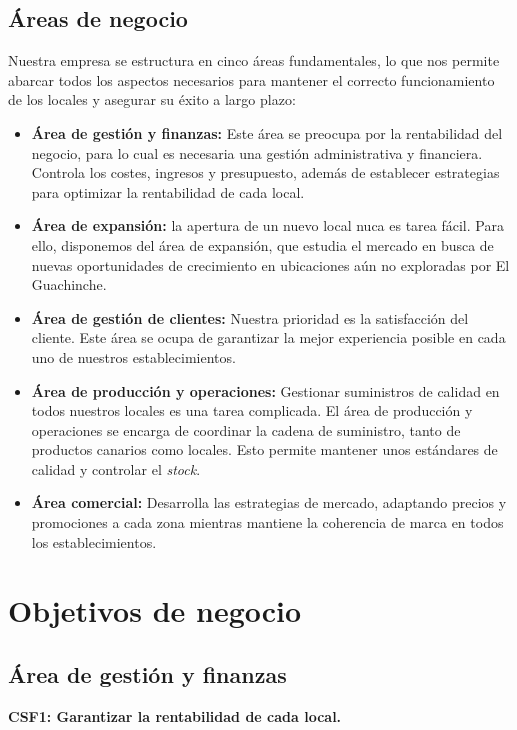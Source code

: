 \documentclass[12pt]{opticajnl}
\begin{document}
\subsection{Áreas de negocio}
Nuestra empresa se estructura en cinco áreas fundamentales, lo que nos permite abarcar todos los aspectos necesarios para mantener el correcto funcionamiento de los locales y asegurar su éxito a largo plazo:

\begin{itemize}
    \item \textbf{Área de gestión y finanzas:} Este área se preocupa por la rentabilidad del negocio, para lo cual es necesaria una gestión administrativa y financiera. Controla los costes, ingresos y presupuesto, además de establecer estrategias para optimizar la rentabilidad de cada local.
    \item \textbf{Área de expansión:} la apertura de un nuevo local nuca es tarea fácil. Para ello, disponemos del área de expansión, que estudia el mercado en busca de nuevas oportunidades de crecimiento en ubicaciones aún no exploradas por El Guachinche.
    \item \textbf{Área de gestión de clientes:} Nuestra prioridad es la satisfacción del cliente. Este área se ocupa de garantizar la mejor experiencia posible en cada uno de nuestros establecimientos.
    \item \textbf{Área de producción y operaciones:} Gestionar suministros de calidad en todos nuestros locales es una tarea complicada. El área de producción y operaciones se encarga de coordinar la cadena de suministro, tanto de productos canarios como locales. Esto permite mantener unos estándares de calidad y controlar el \textit{stock}.
    \item \textbf{Área comercial:} Desarrolla las estrategias de mercado, adaptando precios y promociones a cada zona mientras mantiene la coherencia de marca en todos los establecimientos.
\end{itemize}


\section{Objetivos de negocio}

\subsection{Área de gestión y finanzas}

\textbf{CSF1: Garantizar la rentabilidad de cada local.}
\end{document}
